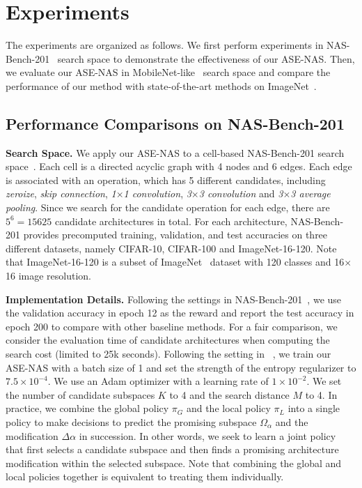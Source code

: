 \documentclass[lettersize,journal]{IEEEtran}
\newcommand{\sexyname}{ASE-NAS\xspace}
\begin{document}
\section{Experiments}

The experiments are organized as follows.
We first perform experiments in NAS-Bench-201~\cite{dong2020nasbench201} search space to demonstrate the effectiveness of our \sexyname.
Then, we evaluate our \sexyname in MobileNet-like~\cite{howard2019searching} search space and compare the performance of our method with state-of-the-art methods on ImageNet~\cite{deng2009imagenet}.

\subsection{Performance Comparisons on NAS-Bench-201}

\textbf{Search Space.}
We apply our \sexyname to a cell-based NAS-Bench-201 search space~\cite{dong2020nasbench201}.
Each cell is a directed acyclic graph with 4 nodes and 6 edges.
Each edge is associated with an operation, which has 5 different candidates, including \textit{zeroize}, \textit{skip connection}, \textit{1$\times$1 convolution}, \textit{3$\times$3 convolution} and \textit{3$\times$3 average pooling}.
Since we search for the candidate operation for each edge, there are $5^6=15625$ candidate architectures in total.
For each architecture, NAS-Bench-201 provides precomputed training, validation, and test accuracies on three different datasets, namely CIFAR-10, CIFAR-100 and ImageNet-16-120. Note that ImageNet-16-120 is a subset of ImageNet~\cite{deng2009imagenet} dataset with 120 classes and 16$\times$16 image resolution.

\textbf{Implementation Details.}
Following the settings in NAS-Bench-201~\cite{dong2020nasbench201}, we use the validation accuracy in epoch 12 as the reward and report the test accuracy in epoch 200 to compare with other baseline methods.
For a fair comparison, we consider the evaluation time of candidate architectures when computing the search cost (limited to 25k seconds).
Following the setting in ~\cite{pham2018efficient}, we train our \sexyname with a batch size of 1 and set the strength of the entropy regularizer to $7.5 \times 10^{-4}$.
We use an Adam optimizer with a learning rate of $1 \times 10^{-2}$.
We set the number of candidate subspaces $K$ to 4 and the search distance $M$ to 4.
In practice, we combine the global policy $\pi_G$ and the local policy $\pi_L$ into a single policy to make decisions to predict the promising subspace $\Omega_\alpha$ and the modification $\Delta \alpha$ in succession.
In other words, we seek to learn a joint policy that first selects a candidate subspace and then finds a promising architecture modification within the selected subspace.
Note that combining the global and local policies together is equivalent to treating them individually.
\end{document}
